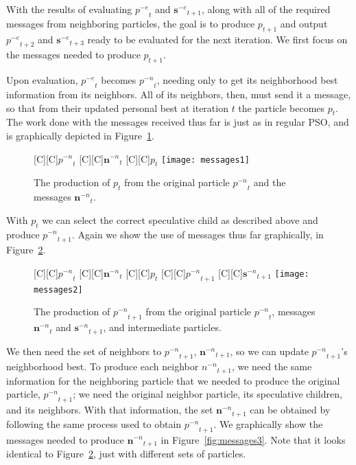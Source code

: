 \documentclass[journal,letterpaper]{IEEEtran}
\newcommand{\fig}[1]{Figure~\ref{fig:#1}}
\providecommand{\noeval}[1]{\ensuremath{#1^{-e}}}
\providecommand{\nonbest}[1]{\ensuremath{#1^{-n}}}
\providecommand{\p}{\ensuremath{p}}
\providecommand{\sset}{\ensuremath{\mathbf{s}}}
\providecommand{\n}{\ensuremath{n}}
\providecommand{\nset}{\ensuremath{\mathbf{n}}}
\begin{document}
With the results of evaluating $\noeval{\p}_t$ and $\noeval{\sset}_{t+1}$,
along with all of the required messages from neighboring particles, the goal is
to produce $\p_{t+1}$ and output $\noeval{\p}_{t+2}$ and $\noeval{\sset}_{t+3}$
ready to be evaluated for the next iteration.  We first focus on the messages
needed to produce $\p_{t+1}$.

Upon evaluation, $\noeval{\p}_t$ becomes $\nonbest{\p}_t$, needing only to get
its neighborhood best information from its neighbors.  All of its neighbors,
then, must send it a message, so that from their updated personal best at
iteration $t$ the particle becomes $\p_t$.  The work done with the messages
received thus far is just as in regular PSO, and is graphically depicted in 
\fig{messages1}.

\begin{figure}
  \centering
  [C][C]{$\nonbest{\p}_{t}$}
  [C][C]{$\nonbest{\nset}_{t}$}
  [C][C]{$\p_{t}$}
  \texttt{[image: messages1]}
  \caption{The production of $\p_{t}$ from the original particle
  $\nonbest{\p}_{t}$ and the messages $\nonbest{\nset}_{t}$.}
  \label{fig:messages1}
\end{figure}

With $\p_t$ we can select the correct speculative child as described above and
produce $\nonbest{\p}_{t+1}$.  Again we show the use of messages thus far
graphically, in \fig{messages2}.  

\begin{figure}
  \centering
  [C][C]{$\nonbest{\p}_{t}$}
  [C][C]{$\nonbest{\nset}_{t}$}
  [C][C]{$\p_{t}$}
  [C][C]{$\nonbest{\p}_{t+1}$}
  [C][C]{$\nonbest{\sset}_{t+1}$}
  \texttt{[image: messages2]}
  \caption{The production of $\nonbest{\p}_{t+1}$ from the original particle 
  $\nonbest{\p}_{t}$, messages $\nonbest{\nset}_{t}$ and
  $\nonbest{\sset}_{t+1}$, and intermediate particles.}
  \label{fig:messages2}
\end{figure}

We then need the set of neighbors to $\nonbest{\p}_{t+1}$,
$\nonbest{\nset}_{t+1}$, so we can update $\nonbest{\p}_{t+1}$'s neighborhood
best.  To produce each neighbor $\nonbest{\n}_{t+1}$, we need the same
information for the neighboring particle that we needed to produce the original
particle, $\nonbest{\p}_{t+1}$; we need the original neighbor particle, its
speculative children, and its neighbors.  With that information, the set
$\nonbest{\nset}_{t+1}$ can be obtained by following the same process used to
obtain $\nonbest{\p}_{t+1}$.  We graphically show the messages needed to
produce $\nonbest{\nset}_{t+1}$ in \fig{messages3}.  Note that it looks
identical to \fig{messages2}, just with different sets of particles.
\end{document}
